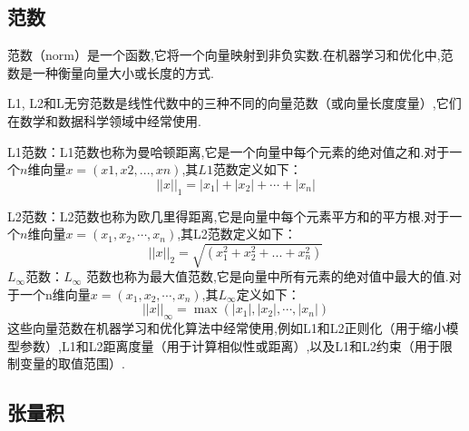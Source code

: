 \documentclass{book}
\begin{document}
\subsection{范数}
范数（norm）是一个函数,它将一个向量映射到非负实数.在机器学习和优化中,范数是一种衡量向量大小或长度的方式.

L1, L2和L无穷范数是线性代数中的三种不同的向量范数（或向量长度度量）,它们在数学和数据科学领域中经常使用.

L1范数：L1范数也称为曼哈顿距离,它是一个向量中每个元素的绝对值之和.对于一个$n$维向量$x = (x1, x2, ..., xn)$,其$L1$范数定义如下：
\begin{equation}
    ||x||_1 = |x_1| + |x_2| + \cdots + |x_n|
\end{equation}

L2范数：L2范数也称为欧几里得距离,它是向量中每个元素平方和的平方根.对于一个$n$维向量$x = (x_1, x_2,\cdots, x_n)$,其L2范数定义如下：
\begin{equation}
    ||x||_2 = \sqrt{(x_1^2 + x_2^2 + ... + x_n^2)}
\end{equation}
$L_\infty$范数：$L_\infty$ 范数也称为最大值范数,它是向量中所有元素的绝对值中最大的值.对于一个n维向量$x = (x_1, x_2,\cdots, x_n)$,其$L_\infty$定义如下：
\begin{equation}
    ||x||_\infty = \max(|x_1|, |x_2|,\cdots, |x_n|)
\end{equation}
这些向量范数在机器学习和优化算法中经常使用,例如L1和L2正则化（用于缩小模型参数）,L1和L2距离度量（用于计算相似性或距离）,以及L1和L2约束（用于限制变量的取值范围）.
\subsection{张量积}
\end{document}
